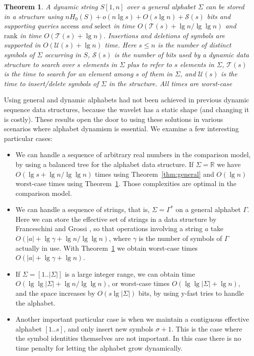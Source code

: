 \documentclass[11pt]{article}
\def\idrm#1{\ensuremath{\mathrm{#1}}}
\newtheorem{theorem}{Theorem}
\newcommand{\ra}{\idrm{rank}}
\newcommand{\sel}{\idrm{select}}
\newcommand{\acc}{\idrm{access}}
\begin{document}
\begin{theorem}
\label{thm:generalwc}
A dynamic string $S[1,n]$ over a general alphabet $\Sigma$ 
can be stored in a structure using 
$nH_0(S) + o(n\lg s) + O(s\lg n) + \mathcal{S}(s)$ 
bits and supporting queries
$\acc$ and $\sel$ in time $O(\mathcal{T}(s)+\lg n/\lg \lg n)$ and
$\ra$ in time $O(\mathcal{T}(s)+\lg n)$.
Insertions and deletions of symbols 
are supported in $O(\mathcal{U}(s)+\lg n)$ time. 
Here $s\le n$ is the number of distinct symbols of $\Sigma$ occurring in $S$,
$\mathcal{S}(s)$ is the number of bits used by a dynamic data structure 
to search over $s$ elements in $\Sigma$ plus to refer to $s$ 
elements in $\Sigma$, $\mathcal{T}(s)$ is the time to search 
for an element among $s$ of them in $\Sigma$, and $\mathcal{U}(s)$
is the time to insert/delete symbols of $\Sigma$ in the structure.
All times are worst-case
\end{theorem}

Using general and dynamic alphabets had not been achieved in previous 
dynamic sequence data structures, because the wavelet has a static shape
(and changing it is costly). These results open the door to using
these solutions in various scenarios where alphabet dynamism is essential.
We examine a few interesting particular cases:

\begin{itemize} 
\item 
We can handle a sequence of arbitrary real numbers in the comparison model,
by using a balanced tree for the alphabet data structure.
If $\Sigma=\mathbb{R}$ we have $O(\lg s+\lg n / \lg\lg n)$
times using Theorem~\ref{thm:general} and $O(\lg n)$ worst-case times using
Theorem~\ref{thm:generalwc}. Those complexities are optimal in the comparison
model.
\item 
We can handle a sequence of strings, that is,
$\Sigma=\Gamma^*$ on a general alphabet
$\Gamma$. Here we can store the effective set of strings in a data structure 
by Franceschini and Grossi \cite{FG04}, so that operations involving a string 
$a$ take $O(|a|+\lg\gamma + \lg n / \lg\lg n)$,
where $\gamma$ is the number of symbols of $\Gamma$ actually in use.
With Theorem~\ref{thm:generalwc} we obtain worst-case times 
$O(|a|+\lg\gamma+\lg n)$.
\item
If $\Sigma=[1..|\Sigma|]$ is a large integer range, we can obtain time
$O(\lg\lg|\Sigma| + \lg n / \lg\lg n)$, or worst-case times 
$O(\lg\lg|\Sigma|+\lg n)$, and the space increases by $O(s\lg|\Sigma|)$ bits, 
by using y-fast tries \cite{Wil83} to handle the alphabet.
\item
Another important particular case is when we maintain a contiguous effective
alphabet $[1..s]$, and only insert new symbols $\sigma+1$. This is the case
where the symbol identities themselves are not important. In this case
there is no time penalty for letting the alphabet grow dynamically.
\end{itemize}
\end{document}
